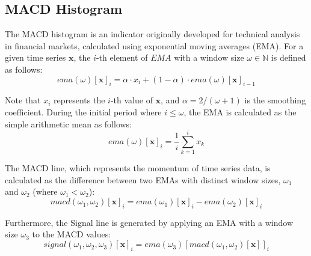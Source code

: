 \documentclass[conference]{IEEEtran}
\begin{document}
\subsection{MACD Histogram}

The MACD histogram \cite{murphy1999technical} is an indicator originally developed for technical analysis in financial markets, calculated using exponential moving averages (EMA). For a given time series $\mathbf{x}$, the $i$-th element of $EMA$ with a window size $\omega \in \mathbb{N}$ is defined as follows:
\begin{equation}
	ema(\omega)[\mathbf{x}]_i = \alpha \cdot x_i + (1-\alpha) \cdot ema(\omega)[\mathbf{x}]_{i-1}
\end{equation}

Note that $x_i$ represents the $i$-th value of $\mathbf{x}$, and $\alpha = 2/(\omega + 1)$ is the smoothing coefficient. During the initial period where $i \le \omega$, the EMA is calculated as the simple arithmetic mean as follows:
\begin{equation}
ema(\omega)[\mathbf{x}]_i = \frac{1}{i} \sum_{k=1}^{i} x_k
\end{equation}

The MACD line, which represents the momentum of time series data, is calculated as the difference between two EMAs with distinct window sizes, $\omega_1$ and $\omega_2$ (where $\omega_1 < \omega_2$):
\begin{equation}
macd(\omega_1, \omega_2)[\mathbf{x}]_i = ema(\omega_1)[\mathbf{x}]_i - ema(\omega_2)[\mathbf{x}]_i
\end{equation}

Furthermore, the Signal line is generated by applying an EMA with a window size $\omega_3$ to the MACD values:
\begin{equation}
signal(\omega_1, \omega_2, \omega_3)[\mathbf{x}]_i = ema(\omega_3)[macd(\omega_1, \omega_2)[\mathbf{x}]]_i
\end{equation}
\end{document}
